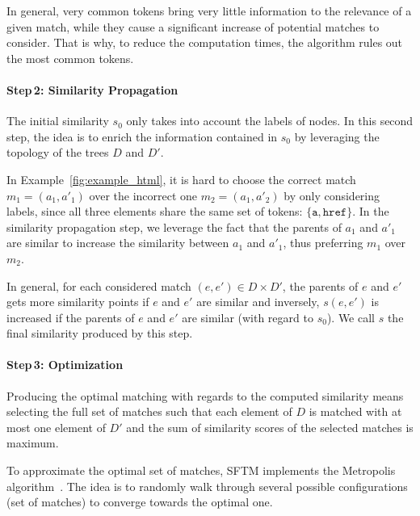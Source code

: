 In general, very common tokens bring very little information to the relevance of a given match, while they cause a significant increase of potential matches to consider.
That is why, to reduce the computation times, the algorithm rules out the most common tokens.

\paragraph{Step\,2: Similarity Propagation}
The initial similarity $s_0$ only takes into account the labels of nodes.
In this second step, the idea is to enrich the information contained in $s_0$ by leveraging the topology of the trees $D$ and $D'$.
\begin{ex}
    In Example~\ref{fig:example_html}, it is hard to choose the correct match $m_1 = (a_1, a'_1)$ over the incorrect one $m_2 = (a_1, a'_2)$ by only considering labels, since all three elements share the same set of tokens: $\{\texttt{a}, \texttt{href}\}$.
    In the similarity propagation step, we leverage the fact that the parents of $a_1$ and $a'_1$ are similar to increase the similarity between $a_1$ and $a'_1$, thus preferring $m_1$ over $m_2$.
\end{ex}
In general, for each considered match $(e, e') \in D \times D'$, the parents of $e$ and $e'$ gets more similarity points if $e$ and $e'$ are similar and inversely, $s(e, e')$ is increased if the parents of $e$ and $e'$ are similar (with regard to $s_0$).
We call $s$ the final similarity produced by this step.

\paragraph{Step\,3: Optimization}
Producing the optimal matching with regards to the computed similarity means selecting the full set of matches such that each element of $D$ is matched with at most one element of $D'$ and the sum of similarity scores of the selected matches is maximum.

To approximate the optimal set of matches, SFTM implements the Metropolis algorithm~\cite{metropolis1953equation}.
The idea is to randomly walk through several possible configurations (set of matches) to converge towards the optimal one.

